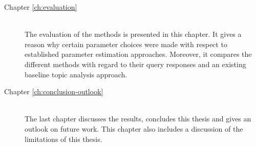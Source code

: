 \begin{description}
    \item[Chapter \ref{ch:evaluation}] \hfill \\
        The evaluation of the methods is presented in this chapter.
        It gives a reason why certain parameter choices were made 
        with respect to established parameter estimation approaches.
        Moreover, it compares the different methods with regard to their query responses 
        and an existing baseline topic analysis approach.

    \item[Chapter \ref{ch:conclusion-outlook}] \hfill \\
        The last chapter discusses the results, concludes this thesis and gives an outlook on future work.
        This chapter also includes a discussion of the limitations of this thesis.

\end{description}